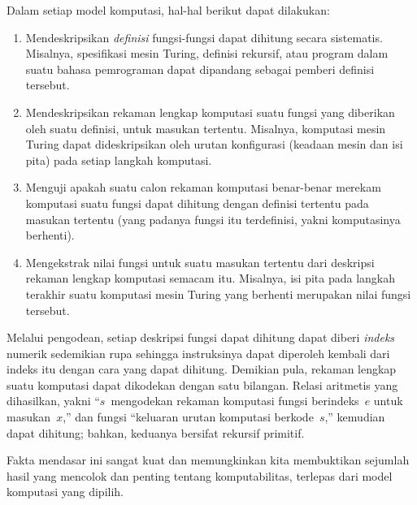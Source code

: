 \documentclass[../../../include/open-logic-section]{subfiles}
\begin{document}

Dalam setiap model komputasi, hal-hal berikut dapat dilakukan:
\begin{enumerate}
\item Mendeskripsikan \emph{definisi} fungsi-fungsi dapat dihitung secara
  sistematis. Misalnya, spesifikasi mesin Turing, definisi rekursif, atau
  program dalam suatu bahasa pemrograman dapat dipandang sebagai pemberi
  definisi tersebut.
\item Mendeskripsikan rekaman lengkap komputasi suatu fungsi yang diberikan
  oleh suatu definisi, untuk masukan tertentu. Misalnya, komputasi mesin Turing
  dapat dideskripsikan oleh urutan konfigurasi (keadaan mesin dan isi pita)
  pada setiap langkah komputasi.
\item Menguji apakah suatu calon rekaman komputasi benar-benar merekam
  komputasi suatu fungsi dapat dihitung dengan definisi tertentu pada masukan
  tertentu (yang padanya fungsi itu terdefinisi, yakni komputasinya berhenti).
\item Mengekstrak nilai fungsi untuk suatu masukan tertentu dari deskripsi
  rekaman lengkap komputasi semacam itu. Misalnya, isi pita pada langkah
  terakhir suatu komputasi mesin Turing yang berhenti merupakan nilai fungsi
  tersebut.
\end{enumerate}

Melalui pengodean, setiap deskripsi fungsi dapat dihitung dapat diberi
\emph{indeks} numerik sedemikian rupa sehingga instruksinya dapat diperoleh
kembali dari indeks itu dengan cara yang dapat dihitung. Demikian pula,
rekaman lengkap suatu komputasi dapat dikodekan dengan satu bilangan. Relasi
aritmetis yang dihasilkan, yakni ``$s$~mengodekan rekaman komputasi fungsi
berindeks~$e$ untuk masukan~$x$,'' dan fungsi ``keluaran urutan komputasi
berkode~$s$,'' kemudian dapat dihitung; bahkan, keduanya bersifat rekursif
primitif.

Fakta mendasar ini sangat kuat dan memungkinkan kita membuktikan sejumlah
hasil yang mencolok dan penting tentang komputabilitas, terlepas dari model
komputasi yang dipilih.
\end{document}
